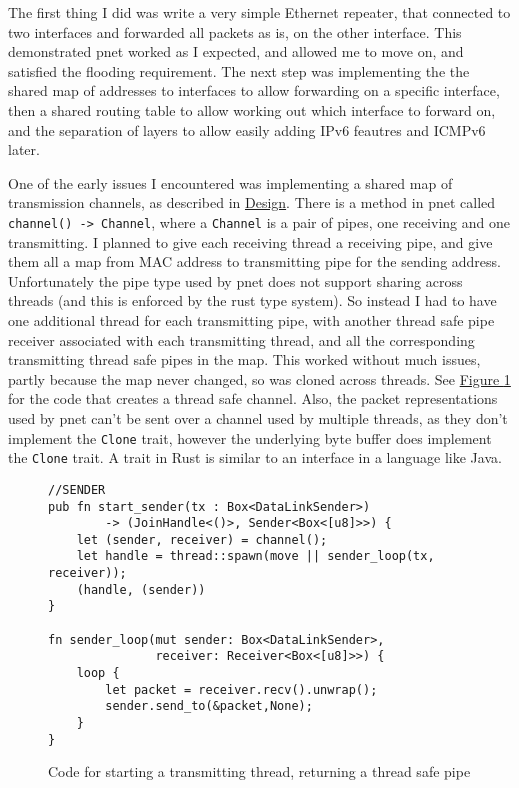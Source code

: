 \documentclass[12pt,a4paper,twoside,openright]{report}
\begin{document}
\bigskip

The first thing I did was write a very simple Ethernet repeater, that connected to two interfaces and forwarded all packets as is, on the other interface.  This demonstrated pnet\cite{pnet_rust} worked as I expected, and allowed me to move on, and satisfied the flooding requirement.  The next step was implementing the the shared map of addresses to interfaces to allow forwarding on a specific interface, then a shared routing table to allow working out which interface to forward on, and the separation of layers to allow easily adding IPv6 feautres and ICMPv6 later.

\bigskip

One of the early issues I encountered was implementing a shared map of transmission channels, as described in \hyperref[sec::design]{Design}. There is a method in pnet\cite{pnet_rust} called \verb!channel() -> Channel!, where a \verb!Channel! is a pair of pipes, one receiving and one transmitting.  I planned to give each receiving thread a receiving pipe, and give them all a map from MAC address to transmitting pipe for the sending address.  Unfortunately the pipe type used by pnet does not support sharing across threads (and this is enforced by the rust type system). So instead I had to have one additional thread for each transmitting pipe, with another thread safe pipe receiver associated with each transmitting thread, and all the corresponding transmitting thread safe pipes in the map.  This worked without much issues, partly because the map never changed, so was cloned across threads.  See \hyperref[fig::sending]{Figure }\ref{fig::sending} for the code that creates a thread safe channel. Also, the packet representations used by pnet can't be sent over a channel used by multiple threads, as they don't implement the \verb!Clone! trait, however the underlying byte buffer does implement the \verb!Clone! trait. A trait in Rust is similar to an interface in a language like Java.

\begin{figure}
\centering
\begin{varwidth}{\linewidth}
\begin{verbatim}
//SENDER
pub fn start_sender(tx : Box<DataLinkSender>) 
 		-> (JoinHandle<()>, Sender<Box<[u8]>>) {
    let (sender, receiver) = channel();
    let handle = thread::spawn(move || sender_loop(tx, receiver));
    (handle, (sender))
}

fn sender_loop(mut sender: Box<DataLinkSender>, 
			   receiver: Receiver<Box<[u8]>>) {
    loop {
        let packet = receiver.recv().unwrap();
        sender.send_to(&packet,None);
    }
}
\end{verbatim}
\end{varwidth}
\caption{Code for starting a transmitting thread, returning a thread safe pipe}
\label{fig::sending}
\end{figure}
\end{document}
